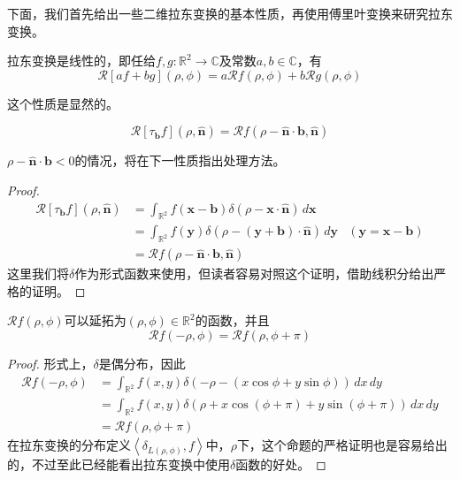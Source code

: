 \documentclass{ctexbook}
\begin{document}
下面，我们首先给出一些二维拉东变换的基本性质，再使用傅里叶变换来研究拉东变换。

\begin{proposition}[线性性]
    拉东变换是线性的，即任给$f,g:\mathbb{R}^2\to\mathbb{C}$及常数$a,b\in\mathbb{C}$，有
    \[\mathcal{R}[af+bg](\rho,\phi)=a\mathcal{R} f(\rho,\phi)+b\mathcal{R} g(\rho,\phi)\]
\end{proposition}
这个性质是显然的。

\begin{proposition}[平移性质]
    \[\mathcal{R} [\tau_{\mathbf{b}}f](\rho,\hat{\mathbf{n}})=\mathcal{R} f(\rho-\hat{\mathbf{n}}\cdot\mathbf{b},\hat{\mathbf{n}})\]
\end{proposition}
$\rho-\hat{\mathbf{n}}\cdot\mathbf{b}<0$的情况，将在下一性质指出处理方法。
\begin{proof}
    \begin{align*}
        \mathcal{R} [\tau_{\mathbf{b}}f](\rho,\hat{\mathbf{n}})&=\int_{\mathbb{R}^2}f(\mathbf{x}-\mathbf{b})\delta(\rho-\mathbf{x}\cdot\hat{\mathbf{n}})\,d\mathbf{x}\\
        &=\int_{\mathbb{R}^2}f(\mathbf{y})\delta(\rho-(\mathbf{y}+\mathbf{b})\cdot\hat{\mathbf{n}})\,d\mathbf{y}&(\mathbf{y}=\mathbf{x}-\mathbf{b})\\
        &=\mathcal{R} f(\rho-\hat{\mathbf{n}}\cdot\mathbf{b},\hat{\mathbf{n}}) 
    \end{align*}
    这里我们将$\delta$作为形式函数来使用，但读者容易对照这个证明，借助线积分给出严格的证明。
\end{proof}

\begin{proposition}[均匀性]
    $\mathcal{R} f(\rho,\phi)$可以延拓为$(\rho,\phi)\in\mathbb{R}^2$的函数，并且
    \[\mathcal{R} f(-\rho,\phi)=\mathcal{R} f(\rho,\phi+\pi)\]
\end{proposition}
\begin{proof}
    形式上，$\delta$是偶分布，因此
    \begin{align*}
        \mathcal{R} f(-\rho,\phi)&=\int_{\mathbb{R}^2}f(x,y)\delta(-\rho - (x\cos\phi+y\sin\phi))\,dx\,dy\\
        &=\int_{\mathbb{R}^2}f(x,y)\delta(\rho + x\cos(\phi+\pi)+y\sin(\phi+\pi))\,dx\,dy\\
        &=\mathcal{R} f(\rho,\phi+\pi)
    \end{align*}
    在拉东变换的分布定义$\left\langle \delta_{L(\rho,\phi)},f\right\rangle$中，$\rho$下，这个命题的严格证明也是容易给出的，不过至此已经能看出拉东变换中使用$\delta$函数的好处。
\end{proof}
\end{document}
